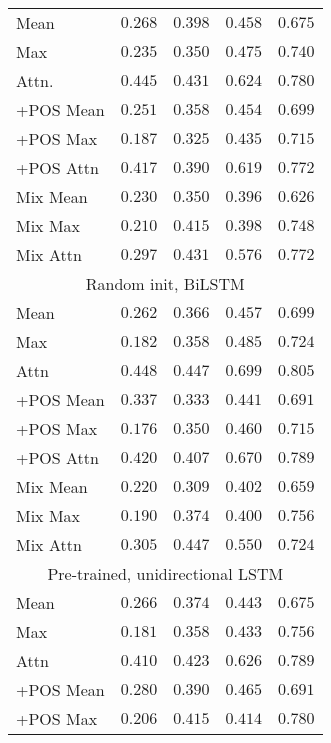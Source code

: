 \begin{table}
\begin{tabular}{lrrrr}
    Mean & $0.268$ & $0.398$ & $0.458$ & $0.675$ \\
    Max & $0.235$ & $0.350$ & $0.475$ & $0.740$ \\
    Attn. & $0.445$ & $0.431$ & $0.624$ & $0.780$ \\
    +POS Mean & $0.251$ & $0.358$ & $0.454$ & $0.699$ \\
    +POS Max & $0.187$ & $0.325$ & $0.435$ & $0.715$ \\
    +POS Attn & $0.417$ & $0.390$ & $0.619$ & $0.772$ \\
    Mix Mean & $0.230$ & $0.350$ & $0.396$ & $0.626$ \\
    Mix Max & $0.210$ & $0.415$ & $0.398$ & $0.748$ \\
    Mix Attn & $0.297$ & $0.431$ & $0.576$ & $0.772$ \\
    \midrule \multicolumn{5}{c}{Random init, BiLSTM} \\ \midrule
    Mean & $0.262$ & $0.366$ & $0.457$ & $0.699$ \\
    Max & $0.182$ & $0.358$ & $0.485$ & $0.724$ \\
    Attn & $\mathbf{0.448}$ & $0.447$ & $0.699$ & $0.805$ \\
    +POS Mean & $0.337$ & $0.333$ & $0.441$ & $0.691$ \\
    +POS Max & $0.176$ & $0.350$ & $0.460$ & $0.715$ \\
    +POS Attn & $0.420$ & $0.407$ & $0.670$ & $0.789$ \\
    Mix Mean & $0.220$ & $0.309$ & $0.402$ & $0.659$ \\
    Mix Max & $0.190$ & $0.374$ & $0.400$ & $0.756$ \\
    Mix Attn & $0.305$ & $0.447$ & $0.550$ & $0.724$ \\
    \midrule \multicolumn{5}{c}{Pre-trained, unidirectional LSTM} \\ \midrule
    Mean & $0.266$ & $0.374$ & $0.443$ & $0.675$ \\
    Max & $0.181$ & $0.358$ & $0.433$ & $0.756$ \\
    Attn & $0.410$ & $0.423$ & $0.626$ & $0.789$ \\
    +POS Mean & $0.280$ & $0.390$ & $0.465$ & $0.691$ \\
    +POS Max & $0.206$ & $0.415$ & $0.414$ & $0.780$ \\

\end{tabular}
\end{table}
